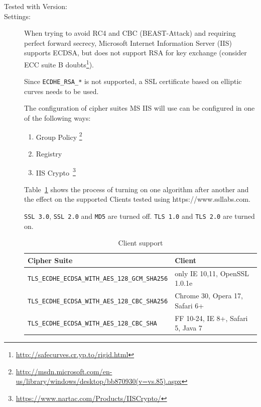 
\begin{description}

\item[Tested with Version:] 

\item[Settings:] \mbox{}


When trying to avoid RC4 and CBC (BEAST-Attack) and requiring perfect
forward secrecy, Microsoft Internet Information Server (IIS) supports
ECDSA, but does not support RSA for key exchange (consider ECC suite
B doubts\footnote{\url{http://safecurves.cr.yp.to/rigid.html}}).

Since \verb|ECDHE_RSA_*| is not supported, a SSL certificate based on
elliptic curves needs to be used.

The configuration of cipher suites MS IIS will use can be configured in one
of the following ways:
\begin{enumerate}
\item Group Policy \footnote{\url{http://msdn.microsoft.com/en-us/library/windows/desktop/bb870930(v=vs.85).aspx}}
\item Registry
\item IIS Crypto~\footnote{\url{https://www.nartac.com/Products/IISCrypto/}}
\end{enumerate}


Table~\ref{tab:MS_IIS_Client_Support} shows the process of turning on
one algorithm after another and the effect on the supported Clients
tested using https://www.ssllabs.com.

\verb|SSL 3.0|, \verb|SSL 2.0| and \verb|MD5| are turned off.
\verb|TLS 1.0| and \verb|TLS 2.0| are turned on.

\begin{table}[h]
  \centering
  \small
  \begin{tabular}{ll}
    \toprule
    Cipher Suite & Client \\
    \midrule
    \verb|TLS_ECDHE_ECDSA_WITH_AES_128_GCM_SHA256| & only IE 10,11, OpenSSL 1.0.1e \\
    \verb|TLS_ECDHE_ECDSA_WITH_AES_128_CBC_SHA256| & Chrome 30, Opera 17, Safari 6+ \\
    \verb|TLS_ECDHE_ECDSA_WITH_AES_128_CBC_SHA| & FF 10-24, IE 8+, Safari 5, Java 7\\
    \bottomrule 
 \end{tabular}
  \caption{Client support}
  \label{tab:MS_IIS_Client_Support}
\end{table}


\end{description}
